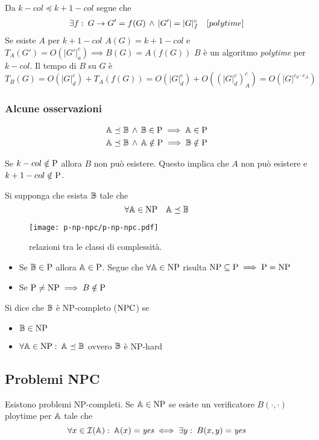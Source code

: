 Da $k-col\preceq k+1-col$ segue che
\begin{gather*}
	\exists f\,\colon\, G\to G'=f(G)\,\wedge\, |G'|=|G|^c_f\quad [polytime]
\end{gather*}
Se esiste $A$ per $k+1-col$ $A(G)=k+1-col$ e $T_A(G')=O(|G'|^c_a)\implies B(G)=A(f(G))$ $B$ è un algoritmo \textit{polytime} per $k-col$. Il tempo di $B$ su $G$ è
\[T_B(G)=O(|G|^c_d)+T_A(f(G))=O(|G|^c_d)+O((|G|^c_d)^c_A)=O(|G|^{c_d\cdot c_A})\]

\subsubsection{Alcune osservazioni}
\begin{gather*}
	\mathbb{A}\preceq\mathbb{B} \,\wedge\, \mathbb{B}\in\text{P}\implies \mathbb{A}\in\text{P}\\
	\mathbb{A}\preceq\mathbb{B}\,\wedge\, \mathbb{A}\notin\text{P}\implies \mathbb{B}\notin\text{P}
\end{gather*}

Se $k-col\notin\text{P}$ allora $B$ non può esistere. Questo implica che $A$ non può esistere e $k+1-col\notin\text{P}$.

Si supponga che esista $\mathbb{B}$ tale che \[\forall \mathbb{A}\in \text{NP}\quad\mathbb{A}\preceq\mathbb{B}\]
\begin{figure}[thbp]
	\centering
	\texttt{[image: p-np-npc/p-np-npc.pdf]}
	\caption{relazioni tra le classi di complessità.}
	\label{fig:p-np-npc}
\end{figure}
\begin{itemize}
	\item Se $\mathbb{B}\in\text{P}$ allora $\mathbb{A}\in\text{P}$. Segue che $\forall \mathbb{A}\in \text{NP}$ risulta $\text{NP}\subseteq \text{P}\implies \text{P}=\text{NP}$
	\item Se $\text{P}\ne \text{NP}\implies B\notin\text{P}$
\end{itemize}
\begin{definition}[NP-completezza]
	Si dice che $\mathbb{B}$ è NP-completo ($\text{NPC}$) se 
	\begin{itemize}
		\item $\mathbb{B}\in \text{NP}$
		\item $\forall \mathbb{A}\in \text{NP}\,\colon\, \mathbb{A}\preceq\mathbb{B}$ ovvero $\mathbb{B}$ è NP-hard
	\end{itemize}
\end{definition}
\subsection{Problemi NPC}
Esistono problemi NP-completi. Se $\mathbb{A}\in\text{NP}$ se esiste un verificatore $B(\cdot,\cdot)$ ploytime per $\mathbb{A}$ tale che \[\forall x \in \mathcal{I}(\mathbb{A})\,\colon\,\mathbb{A}(x)=\textit{yes}\iff\exists y\,\colon\, B(x,y)=\textit{yes}\]
